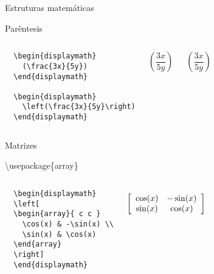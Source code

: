 \begin{frame}{Estruturas matemáticas}
    \begin{block}{Parêntesis}
    \begin{columns}
\begin{verbatim}
  \begin{displaymath}
    (\frac{3x}{5y})
  \end{displaymath}
  
  \begin{displaymath}
    \left(\frac{3x}{5y}\right)
  \end{displaymath}
\end{verbatim}
        \begin{displaymath}
        (\frac{3x}{5y})
        \end{displaymath}

        \begin{displaymath}
        \left(\frac{3x}{5y}\right)
        \end{displaymath}
    \end{columns}
    \end{block}

    \begin{block}{Matrizes}
    
    \textbackslash usepackage\{array\}
    
    \begin{columns}
\begin{verbatim}
  \begin{displaymath}
  \left[
  \begin{array}{ c c }
    \cos(x) & -\sin(x) \\
    \sin(x) & \cos(x)
  \end{array}
  \right]
  \end{displaymath}
\end{verbatim}
        \begin{displaymath}
        \left[
        \begin{array}{ c c }
        \cos(x) & -\sin(x) \\
        \sin(x) & \cos(x)
        \end{array}
        \right]
        \end{displaymath}
    \end{columns}
    \end{block}

\end{frame}

